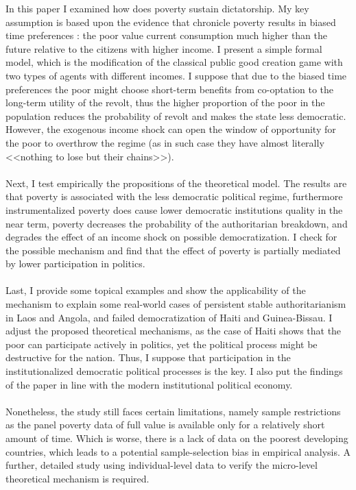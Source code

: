 \documentclass[a4paper, 12pt]{article}
\begin{document}
	\noindent In this paper I examined how does poverty sustain dictatorship. My key assumption is based upon the evidence that chronicle poverty results in biased time preferences \parencite{poverty_consequences}: the poor value current consumption much higher than the future relative to the citizens with higher income. I present a simple formal model, which is the modification of the classical public good creation game with two types of agents with different incomes. I suppose that due to the biased time preferences the poor might choose short-term benefits from co-optation to the long-term utility of the revolt, thus the higher proportion of the poor in the population reduces the probability of revolt and makes the state less democratic. However, the exogenous income shock can open the window of opportunity for the poor to overthrow the regime (as in such case they have almost literally <<nothing to lose but their chains>>).
	\\\\
	Next, I test empirically the propositions of the theoretical model. The results are that poverty is associated with the less democratic political regime, furthermore instrumentalized poverty does cause lower democratic institutions quality in the near term, poverty decreases the probability of the authoritarian breakdown, and degrades the effect of an income shock on possible democratization. I check for the possible mechanism and find that the effect of poverty is partially mediated by lower participation in politics. 
	\\\\
	Last, I provide some topical examples and show the applicability of the mechanism to explain some real-world cases of persistent stable authoritarianism in Laos and Angola, and failed democratization of Haiti and Guinea-Bissau. I adjust the proposed theoretical mechanisms, as the case of Haiti shows that the poor can participate actively in politics, yet the political process might be destructive for the nation. Thus, I suppose that participation in the institutionalized democratic political processes is the key. I also put the findings of the paper in line with the modern institutional political economy.
	\\\\
	Nonetheless, the study still faces certain limitations, namely sample restrictions as the panel poverty data of full value is available only for a relatively short amount of time. Which is worse, there is a lack of data on the poorest developing countries, which leads to a potential sample-selection bias in empirical analysis. A further, detailed study using individual-level data to verify the micro-level theoretical mechanism is required. 
\end{document}
